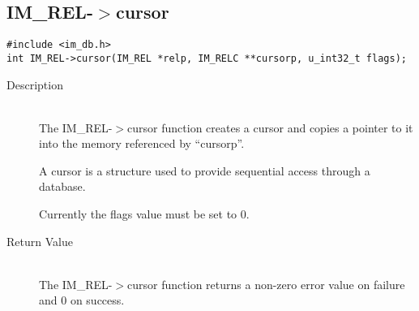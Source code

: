 \documentclass[11pt]{article}
\def\cdf{\sf }
\def\cdf{\sf }
\newcommand{\IMREL}{{\small{\cdf IM\_REL}}}
\begin{document}
\newpage
\subsection{{\IMREL}-$>$cursor}
\begin{verbatim}
#include <im_db.h>
int IM_REL->cursor(IM_REL *relp, IM_RELC **cursorp, u_int32_t flags);
\end{verbatim}
\begin{description}
\item[Description]\ \\

  The IM\_REL-$>$cursor function creates a cursor and copies a pointer
  to it into the memory referenced by ``cursorp''.

  A cursor is a structure used to provide sequential access through a
  database.
  
  Currently the flags value must be set to 0.

\item[Return Value]\ \\
  The IM\_REL-$>$cursor function returns a non-zero error value on
  failure and 0 on success.
\end{description}

\newpage
\end{document}
